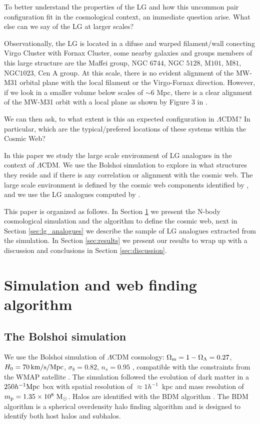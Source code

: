 \documentclass{emulateapj}
\newcommand{\manuscript}{paper }
\newcommand{\mpc}{\rm{Mpc}}
\newcommand{\hmpc}{{\ifmmode{h^{-1}{\rm Mpc}}\else{$h^{-1}$Mpc }\fi}}
\begin{document}
To better understand the properties of the LG and how this uncommon
pair configuration fit in the cosmological context, an immediate
question arise. 
What else can we say of the LG at larger scales?

Observationally, the LG is located in a difuse and
warped filament/wall conecting Virgo Cluster with Fornax Cluster, some
nearby galaxies and groups members of this large structure are the
Maffei group, NGC $6744$, NGC $5128$, M$101$, M$81$, NGC$1023$, Cen A
group. 
At this scale, there is no evident alignment of the MW-M31 orbital
plane with the local filament or the Virgo-Fornax direction. However,
if we look in a smaller volume below scales of $\sim 6$ \mpc, there is
a clear alignment of the MW-M31 orbit with a local plane as shown by
Figure $3$ in \citet{2013AJ....146...69C}.   


We can then ask, to what extent is this an expected configuration in
$\Lambda$CDM? In particular, which are the typical/prefered locations
of these systems within the Cosmic Web? 


In this \manuscript we study the large scale environment of LG 
analogues in the context of $\Lambda$CDM. 
We use the Bolshoi simulation to explore in what structures they
reside and if there is any correlation or alignment with the cosmic
web. 
The large scale environment is defined by the cosmic web components identified by
\citet{Tweb}, and we use the LG analogues computed by
\citet{lganalogues}. 

   
This \manuscript is organized as follows. 
In Section \ref{sec:simulation}
we present the N-body cosmological simulation and the algorithm to
define the cosmic web, next in Section \ref{sec:lg_analogues} we describe the
sample of LG analogues extracted from the simulation. In
Section \ref{sec:results} we present our results to wrap up with a
discussion and conclusions in Section
\ref{sec:discussion}.



\section{Simulation and web finding algorithm}
\label{sec:simulation}

\subsection{The Bolshoi simulation}
We use the Bolshoi simulation of $\Lambda$CDM cosmology: $\Omega_{\rm
  m}=1-\Omega_{\Lambda}=0.27$, $H_0=70\,\rm km/s/Mpc$,
$\sigma_8=0.82$, $n_s=0.95$ \citep{2011ApJ...740..102K}, compatible
with the constraints from the WMAP satellite
\citep{hinshaw_etal13}. The simulation followed the evolution of dark
matter in a $250 \hmpc$ box with spatial resolution of $\approx
1h^{-1}$~kpc and mass resolution of $m_{\rm p}=1.35\times 10^8\ \rm
M_{\odot}$. Halos are identified with the BDM algorithm
\citep{1997astro.ph.12217K}. The BDM algorithm is  a spherical
overdensity halo finding algorithm and is designed to identify both
host halos and subhalos. 
\end{document}
